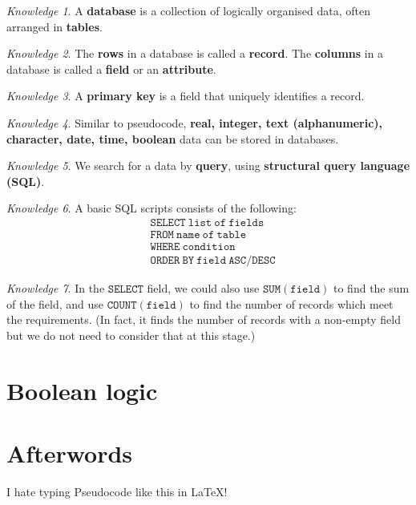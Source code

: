 \documentclass[8pt]{article}
\theoremstyle{remark}
\newtheorem{knowledge}{Knowledge}[subsection]
\begin{document}
        \begin{knowledge}
            A \textbf{database} is a collection of logically organised data, often arranged in \textbf{tables}.
        \end{knowledge}

        \begin{knowledge}
            The \textbf{rows} in a database is called a \textbf{record}. The \textbf{columns} in a database is called a \textbf{field} or an \textbf{attribute}.
        \end{knowledge}

        \begin{knowledge}
            A \textbf{primary key} is a field that uniquely identifies a record.
        \end{knowledge}

        \begin{knowledge}
            Similar to pseudocode, \textbf{real, integer, text (alphanumeric), character, date, time, boolean} data can be stored in databases.
        \end{knowledge}

        \begin{knowledge}
            We search for a data by \textbf{query}, using \textbf{structural query language (SQL)}.
        \end{knowledge}

        \begin{knowledge}
            A basic SQL scripts consists of the following:
            \begin{align*}
                &\mathtt{SELECT\ list\ of\ fields}\\
                &\mathtt{FROM\ name\ of\ table}\\
                &\mathtt{WHERE\ condition}\\
                &\mathtt{ORDER\ BY\ field\ ASC/DESC}
            \end{align*}
        \end{knowledge}

        \begin{knowledge}
            In the \(\mathtt{SELECT}\) field, we could also use \(\mathtt{SUM(field)}\) to find the sum of the field, and use \(\mathtt{COUNT(field)}\) to find the number of records which meet the requirements. (In fact, it finds the number of records with a non-empty field but we do not need to consider that at this stage.)
        \end{knowledge}

    \section{Boolean logic}

    \section*{Afterwords}
        I hate typing Pseudocode like this in \LaTeX!
\end{document}
